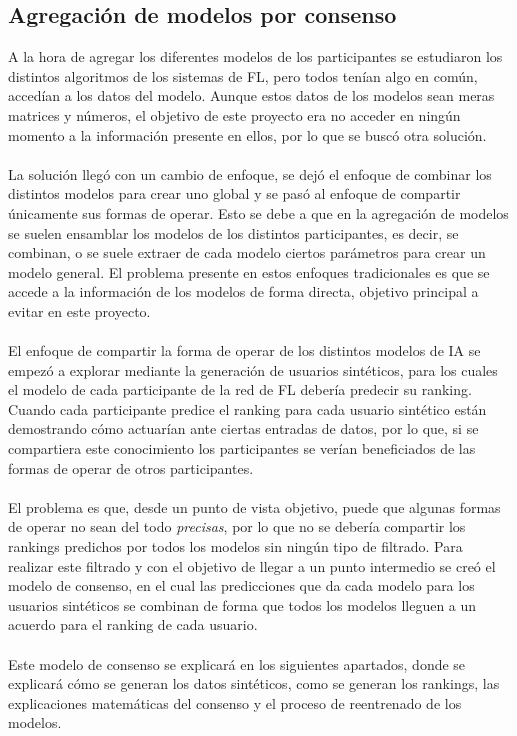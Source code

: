 \subsection{Agregación de modelos por consenso}\label{Consenso}
A la hora de agregar los diferentes modelos de los participantes se estudiaron los distintos algoritmos de los sistemas de FL, pero todos tenían algo en común, accedían a los datos del modelo. Aunque estos datos de los modelos sean meras matrices y números, el objetivo de este proyecto era no acceder en ningún momento a la información presente en ellos, por lo que se buscó otra solución.
\\ \\
La solución llegó con un cambio de enfoque, se dejó el enfoque de combinar los distintos modelos para crear uno global y se pasó al enfoque de compartir únicamente sus formas de operar. Esto se debe a que en la agregación de modelos se suelen ensamblar los modelos de los distintos participantes, es decir, se combinan, o se suele extraer de cada modelo ciertos parámetros para crear un modelo general. El problema presente en estos enfoques tradicionales es que se accede a la información de los modelos de forma directa, objetivo principal a evitar en este proyecto.
\\ \\
El enfoque de compartir la forma de operar de los distintos modelos de IA se empezó a explorar mediante la generación de usuarios sintéticos, para los cuales el modelo de cada participante de la red de FL debería predecir su ranking. Cuando cada participante predice el ranking para cada usuario sintético están demostrando cómo actuarían ante ciertas entradas de datos, por lo que, si se compartiera este conocimiento los participantes se verían beneficiados de las formas de operar de otros participantes.
\\ \\
El problema es que, desde un punto de vista objetivo, puede que algunas formas de operar no sean del todo \textit{precisas}, por lo que no se debería compartir los rankings predichos por todos los modelos sin ningún tipo de filtrado. Para realizar este filtrado y con el objetivo de llegar a un punto intermedio se creó el modelo de consenso, en el cual las predicciones que da cada modelo para los usuarios sintéticos se combinan de forma que todos los modelos lleguen a un acuerdo para el ranking de cada usuario. 
\\ \\
Este modelo de consenso se explicará en los siguientes apartados, donde se explicará cómo se generan los datos sintéticos, como se generan los rankings, las explicaciones matemáticas del consenso y el proceso de reentrenado de los modelos.

